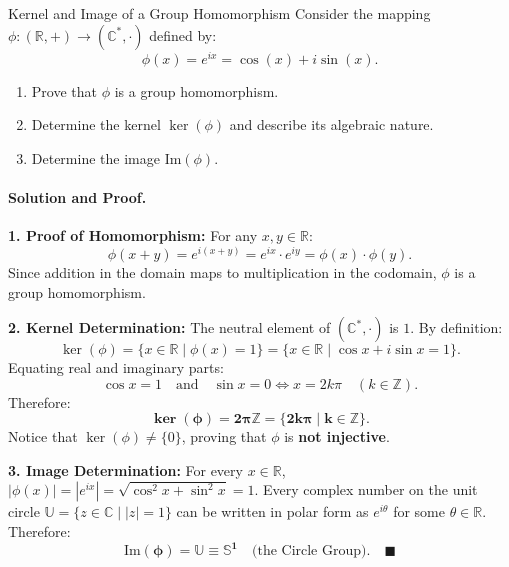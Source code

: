 \begin{workedexample}{Kernel and Image of a Group Homomorphism}
Consider the mapping $\phi: (\mathbb{R}, +) \longrightarrow (\mathbb{C}^*, \cdot)$ defined by:
\[
\phi(x) = e^{i x} = \cos(x) + i \sin(x).
\]
\begin{enumerate}[leftmargin=1.4em,itemsep=2pt]
  \item Prove that $\phi$ is a group homomorphism.
  \item Determine the kernel $\ker(\phi)$ and describe its algebraic nature.
  \item Determine the image $\mathrm{Im}(\phi)$.
\end{enumerate}

\paragraph{Solution and Proof.}
\textbf{1. Proof of Homomorphism:}
For any $x, y \in \mathbb{R}$:
\[
\phi(x + y) = e^{i(x + y)} = e^{i x} \cdot e^{i y} = \phi(x) \cdot \phi(y).
\]
Since addition in the domain maps to multiplication in the codomain, $\phi$ is a group homomorphism.

\textbf{2. Kernel Determination:}
The neutral element of $(\mathbb{C}^*, \cdot)$ is $1$. By definition:
\[
\ker(\phi) = \{ x \in \mathbb{R} \mid \phi(x) = 1 \} = \{ x \in \mathbb{R} \mid \cos x + i \sin x = 1 \}.
\]
Equating real and imaginary parts:
\[
\cos x = 1 \quad \text{and} \quad \sin x = 0 \iff x = 2 k \pi \quad (k \in \mathbb{Z}).
\]
Therefore:
\[
\mathbf{\ker(\phi) = 2\pi\mathbb{Z} = \{ 2 k \pi \mid k \in \mathbb{Z} \}}.
\]
Notice that $\ker(\phi) \neq \{0\}$, proving that $\phi$ is \textbf{not injective}.

\textbf{3. Image Determination:}
For every $x \in \mathbb{R}$, $|\phi(x)| = |e^{i x}| = \sqrt{\cos^2 x + \sin^2 x} = 1$.
Every complex number on the unit circle $\mathbb{U} = \{ z \in \mathbb{C} \mid |z| = 1 \}$ can be written in polar form as $e^{i \theta}$ for some $\theta \in \mathbb{R}$.
Therefore:
\[
\mathbf{\mathrm{Im}(\phi) = \mathbb{U} \equiv \mathbb{S}^1} \quad \text{(the Circle Group)}. \quad \blacksquare
\]
\end{workedexample}

